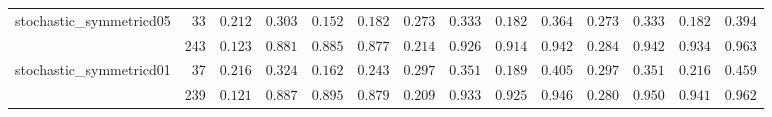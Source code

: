 \begin{longtable}{lrrrrrrrrrrrrr}
stochastic\_symmetricd05 & 33 & $0.212$ & \textbf{$0.303$} & $0.152$ & $0.182$ & $0.273$ & \textbf{$0.333$} & $0.182$ & $0.364$ & $0.273$ & \textbf{$0.333$} & $0.182$ & $0.394$ \\ 
 & 243 & $0.123$ & $0.881$ & $0.885$ & $0.877$ & $0.214$ & $0.926$ & $0.914$ & $0.942$ & $0.284$ & $0.942$ & $0.934$ & $0.963$ \\ 
stochastic\_symmetricd01 & 37 & $0.216$ & \textbf{$0.324$} & $0.162$ & $0.243$ & $0.297$ & \textbf{$0.351$} & $0.189$ & $0.405$ & $0.297$ & \textbf{$0.351$} & $0.216$ & $0.459$ \\ 
 & 239 & $0.121$ & $0.887$ & $0.895$ & $0.879$ & $0.209$ & $0.933$ & $0.925$ & $0.946$ & $0.280$ & $0.950$ & $0.941$ & $0.962$ \\ 
\bottomrule
\end{longtable}

